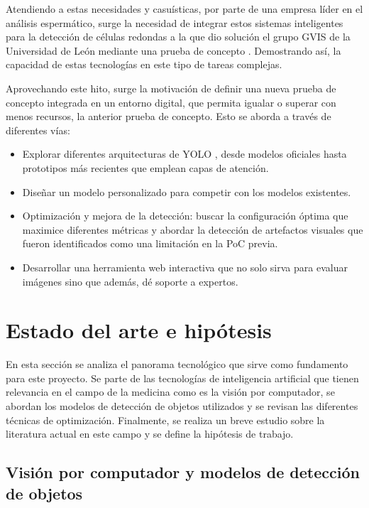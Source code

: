 \documentclass[12pt,a4paper,onecolumn,oneside]{report}
\begin{document}
Atendiendo a estas necesidades y casuísticas, por parte de una empresa líder en el análisis espermático, surge la necesidad de integrar estos sistemas inteligentes para la detección de células redondas a la que dio solución el grupo GVIS de la 
Universidad de León mediante una prueba de concepto \cite{HamiltonThorneRoundCells}. Demostrando así, la capacidad de estas tecnologías en este tipo de tareas complejas.

Aprovechando este hito, surge la motivación de definir una nueva prueba de concepto integrada en un entorno digital, que permita igualar o superar con menos recursos, la anterior prueba de concepto. Esto se aborda a través de diferentes vías:

\begin{itemize}
  \item Explorar diferentes arquitecturas de YOLO \cite{ultralytics_models}, desde modelos oficiales hasta prototipos más recientes que emplean capas de atención. 
  \item Diseñar un modelo personalizado para competir con los modelos existentes.
  \item Optimización y mejora de la detección: buscar la configuración óptima que maximice diferentes métricas y abordar la detección de artefactos visuales que fueron identificados como una limitación en la PoC previa. 
  \item Desarrollar una herramienta web interactiva que no solo sirva para evaluar imágenes sino que además, dé soporte a expertos.
\end{itemize}

\section{Estado del arte e hipótesis}
\label{sec:Estado del arte e hipótesis}

En esta sección se analiza el panorama tecnológico que sirve como fundamento para este proyecto. Se parte de las tecnologías de inteligencia artificial que tienen relevancia en el campo de la medicina como es la 
visión por computador, se abordan los modelos de detección de objetos utilizados y se revisan las diferentes técnicas de optimización. Finalmente, se realiza un breve estudio sobre la literatura actual 
en este campo y se define la hipótesis de trabajo.

\subsection{Visión por computador y modelos de detección de objetos}
\end{document}
